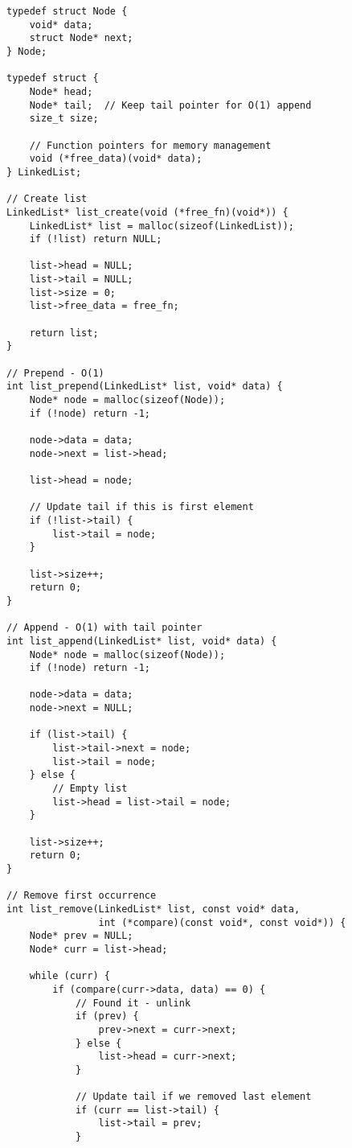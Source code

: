 \begin{lstlisting}
typedef struct Node {
    void* data;
    struct Node* next;
} Node;

typedef struct {
    Node* head;
    Node* tail;  // Keep tail pointer for O(1) append
    size_t size;

    // Function pointers for memory management
    void (*free_data)(void* data);
} LinkedList;

// Create list
LinkedList* list_create(void (*free_fn)(void*)) {
    LinkedList* list = malloc(sizeof(LinkedList));
    if (!list) return NULL;

    list->head = NULL;
    list->tail = NULL;
    list->size = 0;
    list->free_data = free_fn;

    return list;
}

// Prepend - O(1)
int list_prepend(LinkedList* list, void* data) {
    Node* node = malloc(sizeof(Node));
    if (!node) return -1;

    node->data = data;
    node->next = list->head;

    list->head = node;

    // Update tail if this is first element
    if (!list->tail) {
        list->tail = node;
    }

    list->size++;
    return 0;
}

// Append - O(1) with tail pointer
int list_append(LinkedList* list, void* data) {
    Node* node = malloc(sizeof(Node));
    if (!node) return -1;

    node->data = data;
    node->next = NULL;

    if (list->tail) {
        list->tail->next = node;
        list->tail = node;
    } else {
        // Empty list
        list->head = list->tail = node;
    }

    list->size++;
    return 0;
}

// Remove first occurrence
int list_remove(LinkedList* list, const void* data,
                int (*compare)(const void*, const void*)) {
    Node* prev = NULL;
    Node* curr = list->head;

    while (curr) {
        if (compare(curr->data, data) == 0) {
            // Found it - unlink
            if (prev) {
                prev->next = curr->next;
            } else {
                list->head = curr->next;
            }

            // Update tail if we removed last element
            if (curr == list->tail) {
                list->tail = prev;
            }


\end{lstlisting}
